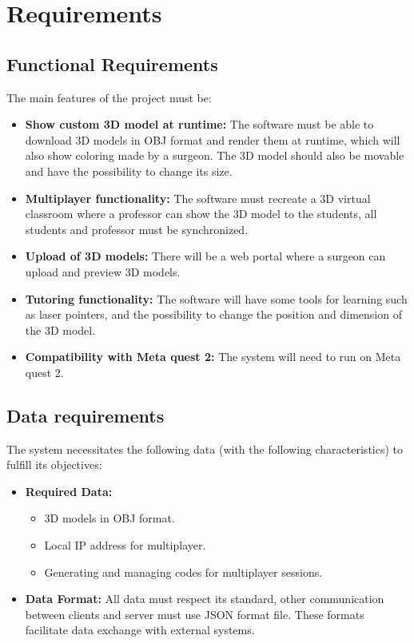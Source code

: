 
\chapter{Requirements}
\label{chp:Requirements}

\section{Functional Requirements}
\noindent
The main features of the project must be:

\begin{itemize}
  \item \textbf{Show custom 3D model at runtime:} The software must be able to download 3D models in OBJ format and render them at runtime, which will also show coloring made by a surgeon. The 3D model should also be movable and have the possibility to change its size. 
  \item \textbf{Multiplayer functionality:} The software must recreate a 3D virtual classroom where a professor can show the 3D model to the students, all students and professor must be synchronized.
  \item \textbf{Upload of 3D models:} There will be a web portal where a surgeon can upload and preview 3D models.
  \item \textbf{Tutoring functionality:} The software will have some tools for learning such as laser pointers, and the possibility to change the position and dimension of the 3D model.
  \item \textbf{Compatibility with Meta quest 2:} The system will need to run on Meta quest 2. 
\end{itemize}
\section{Data requirements}
\noindent
The system necessitates the following data (with the following characteristics) to fulfill its objectives:

\begin{itemize}
  \item \textbf{Required Data:} 
  \begin{itemize}
    \item 3D models in OBJ format.
    \item Local \ac{IP} address for multiplayer.
    \item Generating and managing codes for multiplayer sessions.
  \end{itemize}
  \item \textbf{Data Format:} All data must respect its standard, other communication between clients and server must use \ac{JSON} format file. These formats facilitate data exchange with external systems.
\end{itemize}

